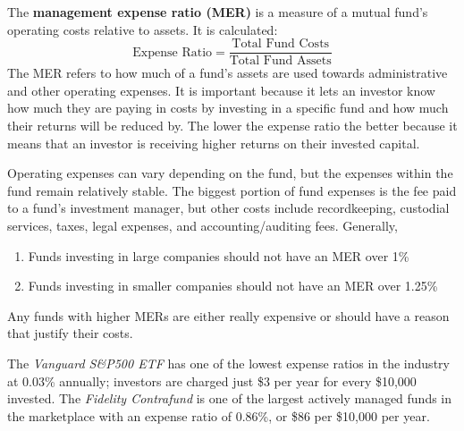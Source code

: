 \documentclass{article}
\begin{document}
      \begin{definition}
        \label{def:management-expense-ratio}
        The \textbf{management expense ratio (MER)} is a measure of a mutual fund's operating costs relative to assets. It is calculated: 
        \begin{equation}
          \text{Expense Ratio} = \frac{\text{Total Fund Costs}}{\text{Total Fund Assets}}
        \end{equation}
        The MER refers to how much of a fund's assets are used towards administrative and other operating expenses. It is important because it lets an investor know how much they are paying in costs by investing in a specific fund and how much their returns will be reduced by. The lower the expense ratio the better because it means that an investor is receiving higher returns on their invested capital. 


        Operating expenses can vary depending on the fund, but the expenses within the fund remain relatively stable. The biggest portion of fund expenses is the fee paid to a fund's investment manager, but other costs include recordkeeping, custodial services, taxes, legal expenses, and accounting/auditing fees. Generally, 
        \begin{enumerate}
            \item Funds investing in large companies should not have an MER over 1\%
            \item Funds investing in smaller companies should not have an MER over 1.25\%
        \end{enumerate}
        Any funds with higher MERs are either really expensive or should have a reason that justify their costs. 
      \end{definition}

      \begin{example}
        \label{ex:vanguard-s-p500-etf-mer}
        The \textit{Vanguard S\&P500 ETF} has one of the lowest expense ratios in the industry at 0.03\% annually; investors are charged just \$3 per year for every \$10,000 invested. The \textit{Fidelity Contrafund} is one of the largest actively managed funds in the marketplace with an expense ratio of 0.86\%, or \$86 per \$10,000 per year. 
      \end{example}
\end{document}
